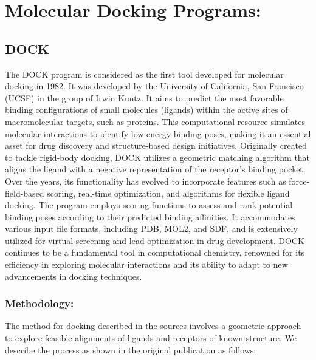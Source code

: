 \section*{Molecular Docking Programs:}

\subsection*{DOCK}
The DOCK program is considered as the first tool developed for molecular docking in 1982\cite{bib71}. It was developed by the University of California, San Francisco (UCSF) in the group of Irwin Kuntz. It aims to predict the most favorable binding configurations of small molecules (ligands) within the active sites of macromolecular targets, such as proteins. This computational resource simulates molecular interactions to identify low-energy binding poses, making it an essential asset for drug discovery and structure-based design initiatives. Originally created to tackle rigid-body docking, DOCK utilizes a geometric matching algorithm that aligns the ligand with a negative representation of the receptor's binding pocket. Over the years, its functionality has evolved to incorporate features such as force-field-based scoring, real-time optimization, and algorithms for flexible ligand docking\cite{bib18}. The program employs scoring functions to assess and rank potential binding poses according to their predicted binding affinities. It accommodates various input file formats, including PDB, MOL2, and SDF, and is extensively utilized for virtual screening and lead optimization in drug development. DOCK continues to be a fundamental tool in computational chemistry, renowned for its efficiency in exploring molecular interactions and its ability to adapt to new advancements in docking techniques.

\subsubsection*{Methodology:} The method for docking described in the sources involves a geometric approach to explore feasible alignments of ligands and receptors of known structure. We describe the process as shown in the original publication\cite{bib71} as follows:

